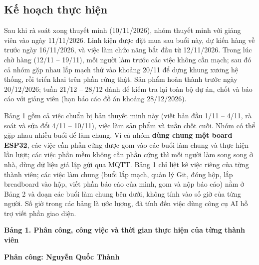 \documentclass[12pt,a4paper]{article}
\begin{document}
\subsection{Kế hoạch thực hiện}
\label{sec:kehoach}
Sau khi rà soát xong thuyết minh (10/11/2026), nhóm thuyết minh với giảng viên vào ngày 11/11/2026. Linh kiện được đặt mua sau buổi này, dự kiến hàng về trước ngày 16/11/2026, và việc làm chức năng bắt đầu từ 12/11/2026. Trong lúc chờ hàng (12/11 -- 19/11), mỗi người làm trước các việc không cần mạch; sau đó cả nhóm gặp nhau lắp mạch thử vào khoảng 20/11 để dựng khung xương hệ thống, rồi triển khai trên phần cứng thật. Sản phẩm hoàn thành trước ngày 20/12/2026; tuần 21/12 -- 28/12 dành để kiểm tra lại toàn bộ dự án, chốt và báo cáo với giảng viên (hạn báo cáo đồ án khoảng 28/12/2026).

Bảng 1 gồm cả việc chuẩn bị bản thuyết minh này (viết bản đầu 1/11 -- 4/11, rà soát và sửa đổi 4/11 -- 10/11), việc làm sản phẩm và tuần chốt cuối. Nhóm có thể gặp nhau nhiều buổi để làm chung. Vì cả nhóm \textbf{dùng chung một board ESP32}, các việc cần phần cứng được gom vào các buổi làm chung và thực hiện lần lượt; các việc phần mềm không cần phần cứng thì mỗi người làm song song ở nhà, dùng dữ liệu giả lập gửi qua MQTT. Bảng 1 chỉ liệt kê việc riêng của từng thành viên; các việc làm chung (buổi lắp mạch, quản lý Git, đóng hộp, lắp breadboard vào hộp, viết phần báo cáo của mình, gom và nộp báo cáo) nằm ở Bảng 2 và đoạn các buổi làm chung bên dưới, không tính vào số giờ của từng người. Số giờ trong các bảng là ước lượng, đã tính đến việc dùng công cụ AI hỗ trợ viết phần giao diện.

\textbf{Bảng 1. Phân công, công việc và thời gian thực hiện của từng thành viên}

\medskip
\textbf{Phân công: Nguyễn Quốc Thành}
\end{document}
